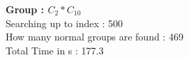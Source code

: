 \textbf{Group : $C_2*C_{10}$}\\
Searching up to index : 500\\
How many normal groups are found : 469\\
Total Time in s : 177.3\\
